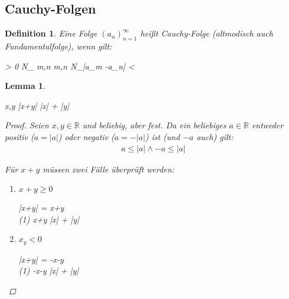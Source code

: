 \documentclass{article}
\newtheorem{lem}[thm]{Lemma}
\newtheorem{defn}{Definition}[section]
\newenvironment{aleq}{
\begin{equation}
\begin{aligned}
}{
\end{aligned}
\end{equation}
}
\newenvironment{aleq*}{\begin{equation*}\begin{aligned}}{\end{aligned}\end{equation*}}
\begin{document}
	\subsection{Cauchy-Folgen}
	\begin{defn}
		Eine Folge \((a_n)_{n=1}^\infty\) heißt Cauchy-Folge (altmodisch auch Fundamentalfolge), wenn gilt:
		\begin{aleq*}
			\forall \varepsilon > 0 \colon \exists N_\varepsilon \in {} \colon \forall m,n \in {} \colon m,n \geq N_\varepsilon \implies |a_m -a_n| < \varepsilon
		\end{aleq*}
	\end{defn}
	
	\begin{lem}
		\label{betragSumme}
		\begin{aleq*}
			\forall x,y \in {} \colon |x+y| \leq |x| + |y|
		\end{aleq*}
		\begin{proof}
			Seien \(x,y \in \mathbb{R}\) und beliebig, aber fest.
			Da ein beliebiges \(a \in \mathbb{R}\) entweder positiv (\(a = |a|\)) oder negativ (\(a = -|a|\)) ist (und \(-a\) auch) gilt:
			\begin{aleq}
				a \leq |a| \land -a \leq |a|
			\end{aleq}
			\par
			Für \(x+y\) müssen zwei Fälle überprüft werden:
			\begin{enumerate}[label=\theenumi . Fall: ]
				\item \(x+y \geq 0\) \\
				\begin{aleq*}
					|x+y| = x+y \\
					(1) \implies x+y \leq |x| + |y|
				\end{aleq*}
				
				\item \(x_y < 0\) \\
				\begin{aleq*}
					|x+y| = -x-y \\
					(1) \implies -x-y \leq |x| + |y|
				\end{aleq*}
			\end{enumerate}
		\end{proof}
	\end{lem}
	
\end{document}
